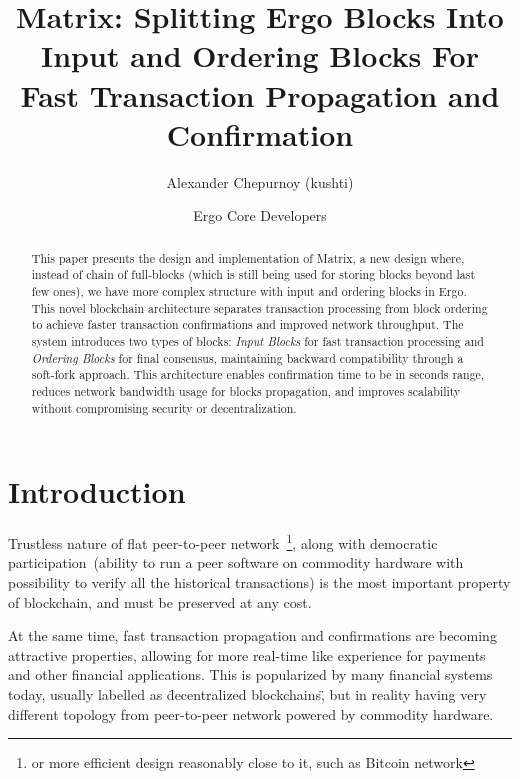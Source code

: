 \documentclass{llncs}
\begin{document}
\title{Matrix: Splitting Ergo Blocks Into Input and Ordering Blocks For Fast Transaction Propagation and Confirmation}

\author{Alexander Chepurnoy (kushti) \and Ergo Core Developers}

\maketitle

\begin{abstract}
This paper presents the design and implementation of Matrix, a new design where, instead of chain of full-blocks (which is still
being used for storing blocks beyond last few ones), we have more complex structure with input and ordering blocks in Ergo.
This novel blockchain architecture separates transaction processing from block ordering to achieve faster transaction confirmations and improved
network throughput. The system introduces two types of blocks: \emph{Input Blocks} for fast transaction processing
and \emph{Ordering Blocks} for final consensus, maintaining backward compatibility through a soft-fork approach.
This architecture enables confirmation time to be in seconds range, reduces network bandwidth usage for blocks propagation, and improves scalability
without compromising security or decentralization.
\end{abstract}


\section{Introduction}

Trustless nature of flat peer-to-peer network~\footnote{or more efficient design reasonably close to it, such as Bitcoin network}, along
with democratic participation~(ability to run a peer software on commodity hardware with possibility to verify all the historical transactions)
is the most important property of blockchain, and must be preserved at any cost.

At the same time, fast transaction propagation and confirmations are becoming attractive properties, allowing for more
real-time like experience for payments and other financial applications. This is popularized by many financial systems
today, usually labelled as \"decentralized blockchains\", but in reality having very different topology from peer-to-peer
network powered by commodity hardware.
\end{document}
